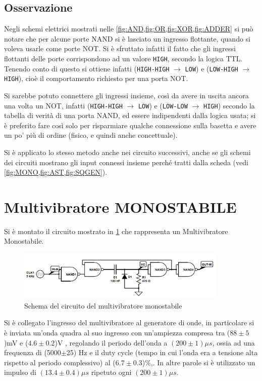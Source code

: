 \documentclass[a4paper,10pt]{article}
\def\code#1{\texttt{#1}}
\begin{document}
\subsection{Osservazione} 

Negli schemi elettrici mostrati nelle \cref{fig:AND,fig:OR,fig:XOR,fig:ADDER} si può notare che per alcune porte NAND si è lasciato un ingresso flottante, quando si voleva usarle come porte NOT. Si è sfruttato infatti il fatto che gli ingressi flottanti delle porte corrispondono ad un valore \code{HIGH}, secondo la logica TTL.
Tenendo conto di questo si ottiene infatti (\code{HIGH-HIGH} $\rightarrow$ \code{LOW}) e (\code{LOW-HIGH} $\rightarrow$ \code{HIGH}), cioè il comportamento richiesto per una porta NOT.

Si sarebbe potuto connettere gli ingressi insieme, così da avere in uscita ancora una volta un NOT, infatti (\code{HIGH-HIGH} $\rightarrow$ \code{LOW}) e (\code{LOW-LOW} $\rightarrow$ \code{HIGH}) secondo la tabella di verità di una porta NAND, ed essere indipendenti dalla logica usata; si è preferito fare così solo per risparmiare qualche connessione sulla basetta e avere un po' più di ordine (fisico, e quindi anche concettuale).

Si è applicato lo stesso metodo anche nei circuito successivi, anche se gli schemi dei circuiti mostrano gli input connessi insieme perché tratti dalla scheda (vedi \cref{fig:MONO,fig:AST,fig:SQGEN}).


\section{Multivibratore MONOSTABILE}
Si è montato il circuito mostrato in \cref{fig:MONO} che rappresenta un Multivibratore Monostabile. 


\begin{figure}[H]
	\centering
	\includegraphics[width=0.9\textwidth]{../grafici/Monostabile.png}
	\caption{Schema del circuito del multivibratore monostabile}
	\label{fig:MONO}
\end{figure}


Si è collegato l'ingresso del multivibratore al generatore di onde, in particolare si è inviata un'onda quadra al suo ingresso con un'ampiezza compresa tra ($88\pm5$)mV e ($4.6\pm0.2$)V , regolando il periodo dell'onda a $(200\pm 1) \mu s$, ossia ad una frequenza di (5000$\pm$25) Hz e il duty cycle (tempo in cui l'onda era a tensione alta rispetto al periodo complessivo) al ($6.7\pm0.3$)\%,. In altre parole si è utilizzato un impulso di $(13.4\pm0.4) \mu s$ ripetuto ogni $(200\pm1) \mu s$.
\end{document}
